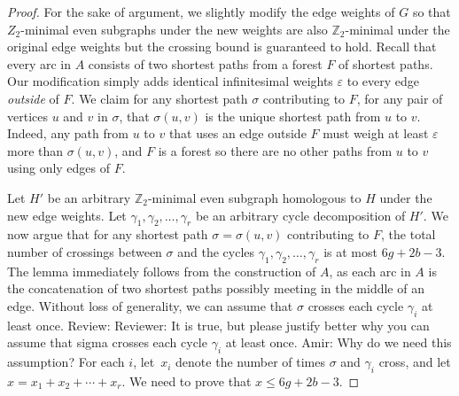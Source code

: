 \documentclass[letterpaper,review]{siamart190516}
\def\Z{\mathbb{Z}}
\let\eps\varepsilon
\def\modified#1{\color{blue}#1 \color{black}}
\def\anote#1{\color{purple}Amir: #1 \color{black}}
\def\rnote#1{\color{red}Review: #1 \color{black}}
\begin{document}

\begin{proof}
For the sake of argument, we slightly modify the edge weights of $G$ so that $Z_2$-minimal even
subgraphs under the new weights are also $\Z_2$-minimal under the original edge weights but the
crossing bound is guaranteed to hold.
Recall that every arc in $A$ consists of two shortest paths from a forest $F$ of shortest paths.
Our modification simply adds identical infinitesimal weights $\eps$ to every edge \emph{outside} of
$F$.
We claim for any shortest path $\sigma$ contributing to $F$, for any pair of vertices $u$ and $v$
in $\sigma$, that $\sigma(u, v)$ is the unique shortest path from $u$ to $v$.
Indeed, any path from $u$ to $v$ that uses an edge outside $F$ must weigh at least $\eps$ more than
$\sigma(u, v)$, and $F$ is a forest so there are no other paths from $u$ to $v$ using only edges of
$F$.

Let $H'$ be an arbitrary $\Z_2$-minimal even subgraph homologous to $H$ under the new edge weights.
Let $\gamma_1, \gamma_2, \dots, \gamma_r$ be an arbitrary cycle decomposition of $H'$.
We now argue that for any shortest path $\sigma = \sigma(u, v)$ contributing to $F$, the total
number of crossings between $\sigma$ and the cycles $\gamma_1, \gamma_2, \dots, \gamma_r$ is at most
$6g+2b-3$.
The lemma immediately follows from the construction of $A$, \modified{as 
each arc in $A$ is the concatenation of two shortest paths possibly meeting in the middle of an edge.}
Without loss of generality, we can assume that $\sigma$ crosses each cycle $\gamma_i$ at least once.  
\rnote{
Reviewer: It is true, but please justify better why you can assume that sigma crosses each cycle $\gamma_i$ at least once. 
}
\anote{
 Why do we need this assumption?
}
For each $i$, let~$x_i$ denote the number of times $\sigma$ and $\gamma_i$ cross, and let $x = x_1 + x_2 + \cdots + x_r$.  We need to prove that $x\le 6g+2b-3$.



\end{proof}
\end{document}
